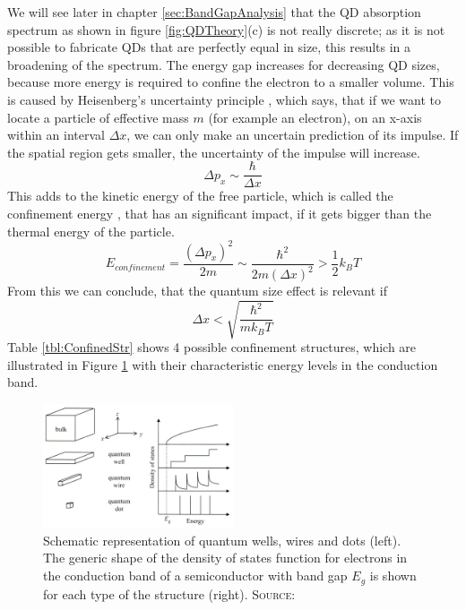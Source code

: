 		
		We will see later in chapter \ref{sec:BandGapAnalysis} that the \gls{QD} absorption spectrum  as shown in figure \ref{fig:QDTheory}(c) is not really discrete; as it is
		not possible to fabricate \glspl{QD} that are perfectly equal in size, this results in a broadening of the spectrum.
		The energy gap increases for decreasing \gls{QD} sizes, because more energy is required to confine the electron to a smaller volume.
		This is caused by Heisenberg's uncertainty principle , which says, that if we want to locate a particle of effective mass $m$ (for example an electron),
		on an x-axis within an interval	$\Delta x$, we can only make an uncertain prediction of its impulse. If the spatial region gets smaller, the uncertainty
		of the impulse will	increase.
		\begin{equation}
			\Delta p_{x} \sim \frac{\hbar}{\Delta x}
		\end{equation}
		This adds to the kinetic energy of the free particle, which is called the confinement  energy , that has an significant impact, if it gets bigger
		than the thermal energy of the particle.
		\begin{equation}
			E_{confinement} = \frac{(\Delta p_{x})^2}{2 m} \sim \frac{\hbar^2}{2 m (\Delta x)^2} > \frac{1}{2} k_{B} T
		\end{equation}
		From this we can conclude, that the quantum size effect is relevant if
		\begin{equation}
			\Delta x < \sqrt{\frac{\hbar^2}{m k_{B} T}}
		\end{equation}
		Table \ref{tbl:ConfinedStr} shows 4 possible confinement structures, which are illustrated in Figure \ref{fig:ConfinedStr} with their
		characteristic energy levels  in	the conduction band.

		\begin{figure}[htbp]		
		\centering
		\includegraphics[width=0.5\textwidth]{Fig/ConfinedStructures.pdf}
		\caption{Schematic representation of quantum wells, wires and dots (left).
						 The generic shape of the density of states function for electrons in the
						 conduction band of a semiconductor with band gap $E_{g}$ is shown for each
						 type of the structure (right).
						 {\scshape Source:} \cite[p.143]{Fox}}
		\label{fig:ConfinedStr}
	\end{figure}
		

